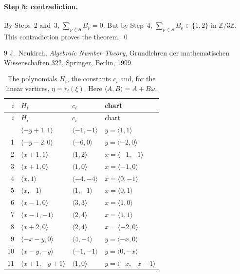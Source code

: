 \documentclass[11pt]{article}
\newcommand{\Z}{\mathbb{Z}}
\begin{document}
\paragraph{Step 5: contradiction.} By Steps~2 and~3, $\sum_{p\in S}B_p=0$. But by Step~4, $\sum_{p\in S}B_p\in\{1,2\}$ in $\Z/3\Z$. This contradiction proves the theorem.
\qed


\begin{thebibliography}{9}
 J.~Neukirch, \emph{Algebraic Number Theory}, Grundlehren der mathematischen Wissenschaften 322, Springer, Berlin, 1999.
\end{thebibliography}

\clearpage
\begingroup\small
\setlength{\LTcapwidth}{\textwidth}
\begin{longtable}{@{}rlll@{}}
\caption{The polynomials $H_i$, the constants $c_i$ and, for the linear vertices, $\eta=r_i(\xi)$. Here $\langle A,B\rangle=A+B\omega$.}\label{tab:vert1}\\
\hline $i$ & $H_i$ & $c_i$ & chart\\\hline\endfirsthead\hline $i$ & $H_i$ & $c_i$ & chart\\\hline\endhead\hline\endfoot
0 & $\langle -y+1,1\rangle$ & $\langle -1,-1\rangle$ & $y=\langle 1,1\rangle$\\
1 & $\langle -y-2,0\rangle$ & $\langle -6,0\rangle$ & $y=\langle -2,0\rangle$\\
2 & $\langle x+1,1\rangle$ & $\langle 1,2\rangle$ & $x=\langle -1,-1\rangle$\\
3 & $\langle x+1,0\rangle$ & $\langle 1,0\rangle$ & $x=\langle -1,0\rangle$\\
4 & $\langle x,1\rangle$ & $\langle -4,-4\rangle$ & $x=\langle 0,-1\rangle$\\
5 & $\langle x,-1\rangle$ & $\langle 1,-1\rangle$ & $x=\langle 0,1\rangle$\\
6 & $\langle x-1,0\rangle$ & $\langle 3,3\rangle$ & $x=\langle 1,0\rangle$\\
7 & $\langle x-1,-1\rangle$ & $\langle 2,4\rangle$ & $x=\langle 1,1\rangle$\\
8 & $\langle x+2,0\rangle$ & $\langle 2,4\rangle$ & $x=\langle -2,0\rangle$\\
9 & $\langle -x-y,0\rangle$ & $\langle 4,-4\rangle$ & $y=\langle -x,0\rangle$\\
10 & $\langle x-y,-y\rangle$ & $\langle -1,-1\rangle$ & $y=\langle 0,-x\rangle$\\
11 & $\langle x+1,-y+1\rangle$ & $\langle 1,0\rangle$ & $y=\langle -x,-x-1\rangle$\\

\end{longtable}
\end{document}
